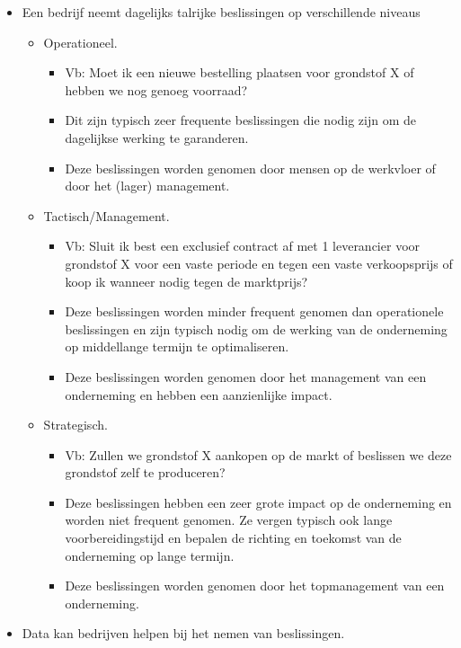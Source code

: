 \documentclass[]{tufte-book}
\providecommand{\tightlist}{%
  \setlength{\itemsep}{0pt}\setlength{\parskip}{0pt}}
\begin{document}
\begin{itemize}
\tightlist
\item
  Een bedrijf neemt dagelijks talrijke beslissingen op verschillende niveaus

  \begin{itemize}
  \tightlist
  \item
    Operationeel.

    \begin{itemize}
    \tightlist
    \item
      Vb: Moet ik een nieuwe bestelling plaatsen voor grondstof X of hebben we nog genoeg voorraad?
    \item
      Dit zijn typisch zeer frequente beslissingen die nodig zijn om de dagelijkse werking te garanderen.
    \item
      Deze beslissingen worden genomen door mensen op de werkvloer of door het (lager) management.
    \end{itemize}
  \item
    Tactisch/Management.

    \begin{itemize}
    \tightlist
    \item
      Vb: Sluit ik best een exclusief contract af met 1 leverancier voor grondstof X voor een vaste periode en tegen een vaste verkoopsprijs of koop ik wanneer nodig tegen de marktprijs?
    \item
      Deze beslissingen worden minder frequent genomen dan operationele beslissingen en zijn typisch nodig om de werking van de onderneming op middellange termijn te optimaliseren.
    \item
      Deze beslissingen worden genomen door het management van een onderneming en hebben een aanzienlijke impact.
    \end{itemize}
  \item
    Strategisch.

    \begin{itemize}
    \tightlist
    \item
      Vb: Zullen we grondstof X aankopen op de markt of beslissen we deze grondstof zelf te produceren?
    \item
      Deze beslissingen hebben een zeer grote impact op de onderneming en worden niet frequent genomen. Ze vergen typisch ook lange voorbereidingstijd en bepalen de richting en toekomst van de onderneming op lange termijn.
    \item
      Deze beslissingen worden genomen door het topmanagement van een onderneming.
    \end{itemize}
  \end{itemize}
\item
  Data kan bedrijven helpen bij het nemen van beslissingen.


\end{itemize}
\end{document}
